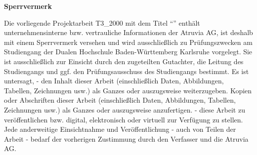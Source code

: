 \vfill
\begin{framed}
\begin{center}
\Large\bfseries Sperrvermerk
\end{center}
\medskip
\noindent
Die vorliegende Projektarbeit T3\_2000 mit dem Titel
\enquote{\Titel}
enthält unternehmensinterne bzw. vertrauliche Informationen der Atruvia AG, ist deshalb mit einem Sperrvermerk versehen und wird ausschließlich zu Prüfungszwecken am Studiengang \Studiengang der Dualen Hochschule Baden-Württemberg Karlsruhe vorgelegt.
\newline
Sie ist ausschließlich zur Einsicht durch den zugeteilten Gutachter, die Leitung des Studiengangs und ggf. den Prüfungsausschuss des Studiengangs bestimmt. Es ist untersagt,
\newline
\indent - den Inhalt dieser Arbeit (einschließlich Daten, Abbildungen, Tabellen, Zeichnungen
\indent   usw.) als Ganzes oder auszugsweise weiterzugeben. Kopien oder Abschriften dieser
\indent   Arbeit (einschließlich Daten, Abbildungen, Tabellen, Zeichnungen usw.) als Ganzes
\indent   oder auszugsweise anzufertigen.
    \newline    
\indent - diese Arbeit zu veröffentlichen bzw. digital, elektronisch oder virtuell zur Verfügung zu
\indent   stellen.
    \newline
Jede anderweitige Einsichtnahme und Veröffentlichung - auch von Teilen der Arbeit - bedarf der vorherigen Zustimmung durch den Verfasser und die Atruvia AG.

\end{framed}

\endinput

